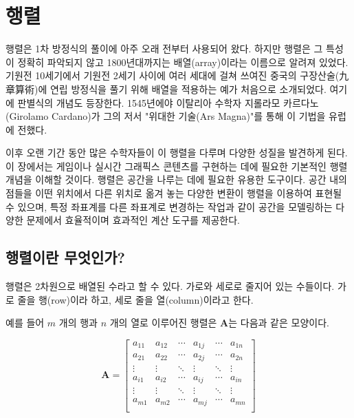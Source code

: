 \renewcommand\chapterillustration{Math_matrix/chapterImage}



\chapter{행렬}

행렬은 1차 방정식의 풀이에 아주 오래 전부터 사용되어 왔다. 하지만 행렬은 그 특성이 정확히 파악되지 않고 1800년대까지는 배열(array)이라는 이름으로 알려져 있었다.
기원전 10세기에서 기원전 2세기 사이에 여러 세대에 걸쳐 쓰여진 중국의 구장산술(九章算術)에 연립 방정식을 풀기 위해 배열을 적용하는 예가 처음으로 소개되었다.
여기에 판별식의 개념도 등장한다. 1545년에야 이탈리아 수학자 지롤라모 카르다노(Girolamo Cardano)가 그의 저서 "위대한 기술(Ars Magna)"를 통해 이 기법을 유럽에 전했다\cite{wiki:matrix}.

이후 오랜 기간 동안 많은 수학자들이 이 행렬을 다루며 다양한 성질을 발견하게 된다. 이 장에서는 게임이나 실시간 그래픽스 콘텐츠를 구현하는 데에 필요한
기본적인 행렬 개념을 이해할 것이다. 행렬은 공간을 나루는 데에 필요한 유용한 도구이다.
공간 내의 점들을 이떤 위치에서 다른 위치로 옮겨 놓는 다양한 변환이 행렬을 이용하여 표현될 수 있으며, 
특정 좌표계를 다른 좌표계로 변경하는 작업과 같이 공간을 모델링하는 다양한 문제에서 효율적이며 효과적인 계산 도구를 제공한다.

\section{행렬이란 무엇인가?}

행렬은 2차원으로 배열된 수라고 할 수 있다. 가로와 세로로 줄지어 있는 수들이다.
가로 줄을 행(row)이라 하고, 세로 줄을 열(column)이라고 한다.

예를 들어 $m$ 개의 행과 $n$ 개의 열로 이루어진 행렬은 $\mathbf A$는 다음과 같은 모양이다.

$$\mathbf A = \left [ 
\begin{array}{cccccc}
a_{11} & a_{12} & \cdots & a_{1j} & \cdots & a_{1n} \\
a_{21} & a_{22} & \cdots & a_{2j} & \cdots & a_{2n} \\
\vdots & \vdots & \ddots &   \vdots   & \ddots & \vdots \\
a_{i1} & a_{i2} & \cdots & a_{ij} & \cdots & a_{in} \\
\vdots & \vdots & \ddots & \vdots & \ddots & \vdots\\
a_{m1} & a_{m2} & \cdots & a_{mj} & \cdots & a_{mn} \\
\end{array}
\right ]$$

